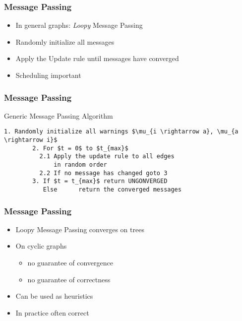 \begin{frame}
	\frametitle{Message Passing}
	\begin{itemize}
		\item In general graphs: \emph{Loopy} Message Passing
		\item Randomly initialize all messages
		\item Apply the Update rule until messages have converged
		\item Scheduling important
	\end{itemize}

		
\end{frame}

\begin{frame}[containsverbatim]
	\frametitle{Message Passing}
	Generic Message Passing Algorithm
	\begin{lstlisting}[mathescape = true, gobble=15, basicstyle=\ttfamily]
		1. Randomly initialize all warnings $\mu_{i \rightarrow a}, \mu_{a \rightarrow i}$
		2. For $t = 0$ to $t_{max}$
		  2.1 Apply the update rule to all edges
		      in random order
		  2.2 If no message has changed goto 3
		3. If $t = t_{max}$ return UNGONVERGED
		   Else      return the converged messages
	\end{lstlisting}
\end{frame}

\begin{frame}
	\frametitle{Message Passing}
	\begin{itemize}
		\item Loopy Message Passing converges on trees
		\item On cyclic graphs
			\begin{itemize}
				\item no guarantee of convergence
				\item no guarantee of correctness
			\end{itemize}
		\item Can be used as heuristics
		\item In practice often correct
			\end{itemize}

		
\end{frame}

